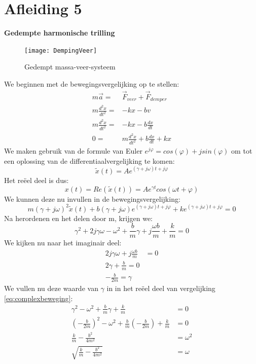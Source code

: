 \documentclass[a4paper,kul]{kulakarticle} %
\begin{document}
\section{Afleiding 5}
\textbf{Gedempte harmonische trilling}\\
\begin{figure}[htbp]
	\centering
	\texttt{[image: DempingVeer]}
	\caption[Gedempt massa veer systeem]{Gedempt massa-veer-systeem}
	\label{fig:dempingveer}
\end{figure}
We beginnen met de bewegingsvergelijking op te stellen:
\begin{align*}
	m \vec{a} =& \vec{F}_{veer} + \vec{F}_{demper}\\
	m \frac{d^2x}{dt^2} = & -kx - bv\\
	m \frac{d^2x}{dt^2} = & -kx - b\frac{dx}{dt}\\
	0 = & m \frac{d^2x}{dt^2} + b\frac{dx}{dt} + kx
\end{align*}
We maken gebruik van de formule van Euler $e^{j\varphi}=cos(\varphi) +jsin(\varphi)$ om tot een oplossing van de differentiaalvergelijking te komen:
\begin{equation*}
	\widetilde{x}(t) = Ae^{(\gamma +j\omega)t+j\varphi}
\end{equation*}
Het reëel deel is dus:
\begin{equation*}
	x(t) = Re(\widetilde{x}(t)) = Ae^{\gamma t}cos(\omega t + \varphi)
\end{equation*}
We kunnen deze nu invullen in de bewegingsvergelijking:
\begin{equation}
	\label{eq:complexbeweging}
	m(\gamma +j\omega)^2\widetilde{x}(t) + b(\gamma +j\omega)e^{(\gamma +j\omega)t+j\varphi}+ke^{(\gamma +j\omega)t+j\varphi} = 0
\end{equation}
Na herordenen en het delen door m, krijgen we:
\begin{equation*}
	\gamma^2+2j\gamma\omega-\omega^2+\frac{b}{m}\gamma+j\frac{\omega b}{m}+\frac{k}{m}=0
\end{equation*}
We kijken nu naar het imaginair deel:
\begin{align*}
	2j\gamma \omega +j\frac{\omega b}{m}&=0\\
	2\gamma + \frac{b}{m} = 0\\
	-\frac{b}{2m} = \gamma
\end{align*}
We vullen nu deze waarde van $\gamma$ in in het reëel deel van vergelijking \ref{eq:complexbeweging}:
\begin{align*}
	\gamma^2-\omega^2+\frac{b}{m}\gamma+\frac{k}{m} &=0\\
	(-\frac{b}{2m})^2-\omega^2+\frac{b}{m}(-\frac{b}{2m})+\frac{k}{m} &=0\\ 
	\frac{k}{m}-\frac{b^2}{4m^2}&=\omega^2\\
	\sqrt{\frac{k}{m}-\frac{b^2}{4m^2}}&=\omega
\end{align*}
\end{document}
